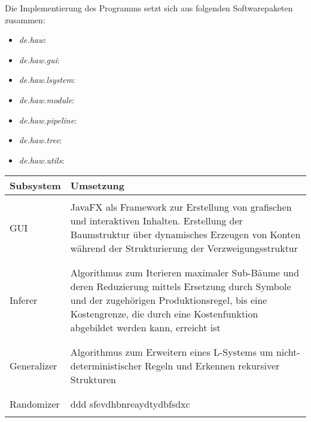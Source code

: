 Die Implementierung des Programms setzt sich aus folgenden Softwarepaketen zusammen:
\begin{itemize}
    \item[\SquareShadowTopLeft] \textit{de.haw}:
    \item[\SquareShadowTopLeft] \textit{de.haw.gui}:
    \item[\SquareShadowTopLeft] \textit{de.haw.lsystem}:
    \item[\SquareShadowTopLeft] \textit{de.haw.module}:
    \item[\SquareShadowTopLeft] \textit{de.haw.pipeline}:
    \item[\SquareShadowTopLeft] \textit{de.haw.tree}:
    \item[\SquareShadowTopLeft] \textit{de.haw.utils}:
\end{itemize}
\begin{center}
    \begin{tabular}{l|l}
        \textbf{Subsystem} & \textbf{Umsetzung} \\
        \hline \\
        GUI &
        \begin{minipage}[t]{0.8\textwidth}
            JavaFX als Framework zur Erstellung von grafischen und interaktiven Inhalten.
            Erstellung der Baumstruktur über dynamisches Erzeugen von Konten während der Strukturierung der
            Verzweigungsstruktur
        \end{minipage} \\
        \\ \hline \\
        Inferer &
        \begin{minipage}[t]{0.8\textwidth}
            Algorithmus zum Iterieren maximaler Sub-Bäume und deren Reduzierung mittels Ersetzung durch Symbole
            und der zugehörigen Produktionsregel, bis eine Kostengrenze, die durch eine Kostenfunktion abgebildet
            werden kann, erreicht ist
        \end{minipage} \\
        \\ \hline \\
        Generalizer &
        \begin{minipage}[t]{0.8\textwidth}
            Algorithmus zum Erweitern eines L-Systems um nicht-deterministischer Regeln und Erkennen rekursiver
            Strukturen
        \end{minipage} \\
        \\ \hline \\
        Randomizer &
        \begin{minipage}[t]{0.8\textwidth}
            ddd sfevdhbnreaydtydbfsdxc
        \end{minipage} \\
        \\ \hline
    \end{tabular}
\end{center}


